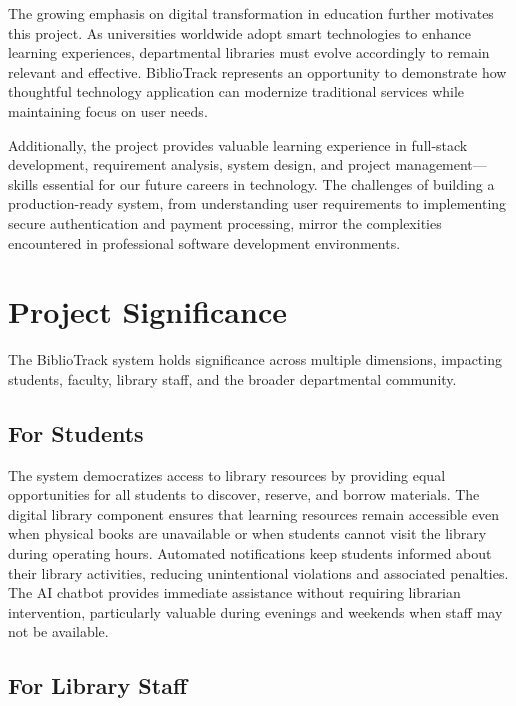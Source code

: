 \documentclass[12pt,a4paper]{report}
\begin{document}
The growing emphasis on digital transformation in education further motivates this project. As universities worldwide adopt smart technologies to enhance learning experiences, departmental libraries must evolve accordingly to remain relevant and effective. BiblioTrack represents an opportunity to demonstrate how thoughtful technology application can modernize traditional services while maintaining focus on user needs.

Additionally, the project provides valuable learning experience in full-stack development, requirement analysis, system design, and project management—skills essential for our future careers in technology. The challenges of building a production-ready system, from understanding user requirements to implementing secure authentication and payment processing, mirror the complexities encountered in professional software development environments.

\section{Project Significance}
\label{sec:significance}

The BiblioTrack system holds significance across multiple dimensions, impacting students, faculty, library staff, and the broader departmental community.

\subsection{For Students}

The system democratizes access to library resources by providing equal opportunities for all students to discover, reserve, and borrow materials. The digital library component ensures that learning resources remain accessible even when physical books are unavailable or when students cannot visit the library during operating hours. Automated notifications keep students informed about their library activities, reducing unintentional violations and associated penalties. The AI chatbot provides immediate assistance without requiring librarian intervention, particularly valuable during evenings and weekends when staff may not be available.

\subsection{For Library Staff}
\end{document}
